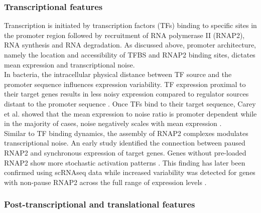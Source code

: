 \subsubsection{Transcriptional features}

Transcription is initiated by transcription factors (TFs) binding to specific sites in the promoter region followed by recruitment of RNA polymerase II (RNAP2), RNA synthesis and RNA degradation. As discussed above, promoter architecture, namely the location and accessibility of TFBS and RNAP2 binding sites, dictates mean expression and transcriptional noise. \\
In bacteria, the intracellular physical distance between TF source and the promoter sequence influences expression variability. TF expression proximal to their target genes results in less noisy expression compared to regulator sources distant to the promoter sequence \citep{Goni-Moreno2017}. Once TFs bind to their target sequence, Carey et al. showed that the mean expression to noise ratio is promoter dependent while in the majority of cases, noise negatively scales with mean expression \citep{Carey2013}.   \\
Similar to TF binding dynamics, the assembly of RNAP2 complexes modulates transcriptional noise. An early study identified the connection between paused RNAP2 and synchronous expression of target genes. Genes without pre-loaded RNAP2 show more stochastic activation patterns \citep{Boettiger2009}. This finding has later been confirmed using scRNAseq data while increased variability was detected for genes with non-pause RNAP2 across the full range of expression levels \citep{Day2016}. 

\subsubsection{Post-transcriptional and translational features}

